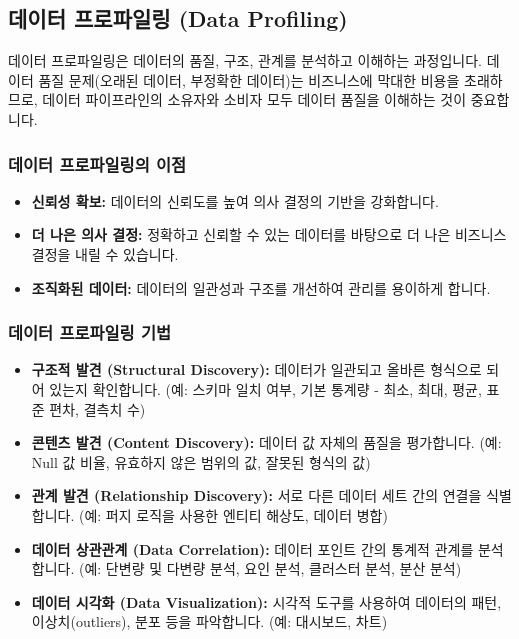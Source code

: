 \documentclass[11pt,a4paper]{article}
\begin{document}
\subsection{데이터 프로파일링 (Data Profiling)}
데이터 프로파일링은 데이터의 품질, 구조, 관계를 분석하고 이해하는 과정입니다. 데이터 품질 문제(오래된 데이터, 부정확한 데이터)는 비즈니스에 막대한 비용을 초래하므로, 데이터 파이프라인의 소유자와 소비자 모두 데이터 품질을 이해하는 것이 중요합니다.

\subsubsection{데이터 프로파일링의 이점}
\begin{itemize}
    \item \textbf{신뢰성 확보:} 데이터의 신뢰도를 높여 의사 결정의 기반을 강화합니다.
    \item \textbf{더 나은 의사 결정:} 정확하고 신뢰할 수 있는 데이터를 바탕으로 더 나은 비즈니스 결정을 내릴 수 있습니다.
    \item \textbf{조직화된 데이터:} 데이터의 일관성과 구조를 개선하여 관리를 용이하게 합니다.
\end{itemize}

\subsubsection{데이터 프로파일링 기법}
\begin{itemize}
    \item \textbf{구조적 발견 (Structural Discovery):} 데이터가 일관되고 올바른 형식으로 되어 있는지 확인합니다. (예: 스키마 일치 여부, 기본 통계량 - 최소, 최대, 평균, 표준 편차, 결측치 수)
    \item \textbf{콘텐츠 발견 (Content Discovery):} 데이터 값 자체의 품질을 평가합니다. (예: Null 값 비율, 유효하지 않은 범위의 값, 잘못된 형식의 값)
    \item \textbf{관계 발견 (Relationship Discovery):} 서로 다른 데이터 세트 간의 연결을 식별합니다. (예: 퍼지 로직을 사용한 엔티티 해상도, 데이터 병합)
    \item \textbf{데이터 상관관계 (Data Correlation):} 데이터 포인트 간의 통계적 관계를 분석합니다. (예: 단변량 및 다변량 분석, 요인 분석, 클러스터 분석, 분산 분석)
    \item \textbf{데이터 시각화 (Data Visualization):} 시각적 도구를 사용하여 데이터의 패턴, 이상치(outliers), 분포 등을 파악합니다. (예: 대시보드, 차트)
\end{itemize}
\end{document}
